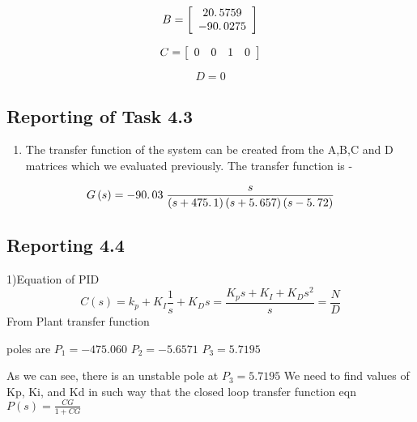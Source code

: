 \documentclass[11pt]{article}
\begin{document}
\begin{par}
$$B=\left\lbrack \begin{array}{c}\linebreak 
20\ldotp 5759\\\linebreak 
-90\ldotp 0275\linebreak 
\end{array}\right\rbrack$$
\end{par}

\begin{par}
$$C=\left\lbrack \begin{array}{cccc}\linebreak 
0 & 0 & 1 & 0\linebreak 
\end{array}\right\rbrack$$
\end{par}

\begin{par}
$$D=0$$
\end{par}
\subsection*{Reporting of Task 4.3}



\begin{enumerate}
\setlength{\itemsep}{-1ex}
   \item{\begin{flushleft} The transfer function of the system can be created from the A,B,C and D matrices which we evaluated previously. The transfer function is -  \end{flushleft}}
\end{enumerate}

\begin{par}
$$G\left(s\right)=-90\ldotp 03\;\frac{s}{\left(s+475\ldotp 1\right)\left(s+5\ldotp 657\right)\left(s-5\ldotp 72\right)}$$
\end{par}

\subsection*{Reporting 4.4}
1)Equation of PID
$$C(s) = k_p + K_I \frac{1}{s} + K_D s = \frac{K_p s + K_I +K_D s^2}{s} = \frac{N}{D}$$
From Plant transfer function 

poles are $P_1 = -475.060$
$P_2 = -5.6571$
$P_3 = 5.7195$

As we can see, there is an unstable pole at $P_3 = 5.7195$ 
We need to find values of Kp, Ki, and Kd in such way that the closed loop transfer function 
eqn 
\newline
$P(s)=\frac{CG}{1+CG}$
\end{document}

